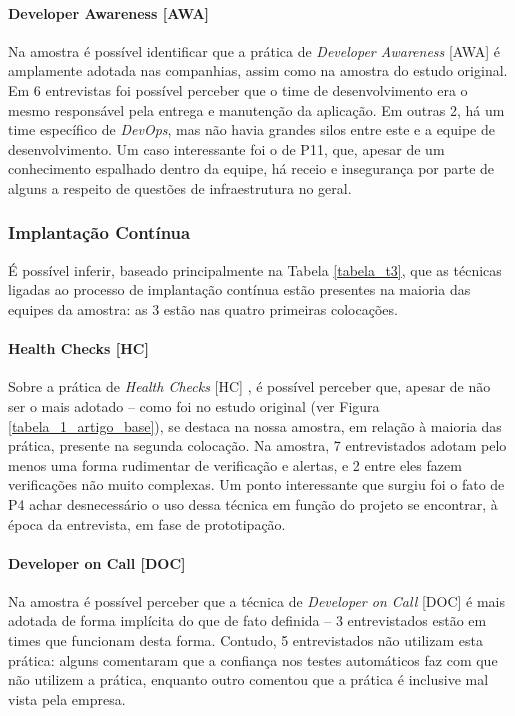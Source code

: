 \paragraph{Developer Awareness [AWA]}

Na amostra é possível identificar que a prática de \emph{Developer Awareness} [AWA] é amplamente adotada nas companhias, assim como na amostra do estudo original. Em 6 entrevistas foi possível perceber que o time de desenvolvimento era o mesmo responsável pela entrega e manutenção da aplicação. Em outras 2, há um time específico de \emph{DevOps}, mas não havia grandes silos entre este e a equipe de desenvolvimento. Um caso interessante foi o de P11, que, apesar de um conhecimento espalhado dentro da equipe, há receio e insegurança por parte de alguns a respeito de questões de infraestrutura no geral.


\subsubsection{Implantação Contínua}

É possível inferir, baseado principalmente na Tabela \ref{tabela_t3}, que as técnicas ligadas ao processo de implantação contínua estão presentes na maioria das equipes da amostra: as 3 estão nas quatro primeiras colocações. 

\paragraph{Health Checks [HC]}

Sobre a prática de \emph{Health Checks} [HC] \cite{devopsBook}, é possível perceber que, apesar de não ser o mais adotado -- como foi no estudo original (ver Figura \ref{tabela_1_artigo_base}), se destaca na nossa amostra, em relação à maioria das prática, presente na segunda colocação. Na amostra, 7 entrevistados adotam pelo menos uma forma rudimentar de verificação e alertas, e 2 entre eles fazem verificações não muito complexas. Um ponto interessante que surgiu foi o fato de P4 achar desnecessário o uso dessa técnica em função do projeto se encontrar, à época da entrevista, em fase de prototipação.

\paragraph{Developer on Call [DOC]}

Na amostra é possível perceber que a técnica de \emph{Developer on Call} [DOC] \cite{devAndDeploymentFB} é mais adotada de forma implícita do que de fato definida -- 3 entrevistados estão em times que funcionam desta forma. Contudo, 5 entrevistados não utilizam esta prática: alguns comentaram que a confiança nos testes automáticos faz com que não utilizem a prática, enquanto outro comentou que a prática é inclusive mal vista pela empresa.

